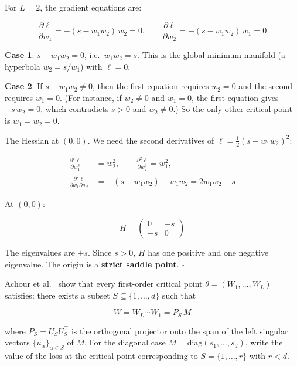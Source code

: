 \documentclass[11pt]{article}
\begin{document}
\begin{solution}[ex:td-1b]
For \(L = 2\), the gradient equations are:

\[\frac{\partial \ell}{\partial w_1} = -(s - w_1 w_2)\,w_2 = 0, \qquad \frac{\partial \ell}{\partial w_2} = -(s - w_1 w_2)\,w_1 = 0\]

\textbf{Case 1}: \(s - w_1 w_2 = 0\), i.e.~\(w_1 w_2 = s\). This is the
global minimum manifold (a hyperbola \(w_2 = s/w_1\)) with \(\ell = 0\).

\textbf{Case 2}: If \(s - w_1 w_2 \neq 0\), then the first equation
requires \(w_2 = 0\) and the second requires \(w_1 = 0\). (For instance,
if \(w_2 \neq 0\) and \(w_1 = 0\), the first equation gives
\(-s\,w_2 = 0\), which contradicts \(s > 0\) and \(w_2 \neq 0\).) So the
only other critical point is \(w_1 = w_2 = 0\).

The Hessian at \((0,0)\). We need the second derivatives of
\(\ell = \frac{1}{2}(s - w_1 w_2)^2\):

\begin{align*}
\frac{\partial^2 \ell}{\partial w_1^2} &= w_2^2, \qquad \frac{\partial^2 \ell}{\partial w_2^2} = w_1^2, \\
\frac{\partial^2 \ell}{\partial w_1 \partial w_2} &= -(s - w_1 w_2) + w_1 w_2 = 2w_1 w_2 - s
\end{align*}

At \((0,0)\):

\[H = \begin{pmatrix} 0 & -s \\ -s & 0 \end{pmatrix}\]

The eigenvalues are \(\pm s\). Since \(s > 0\), \(H\) has one positive
and one negative eigenvalue. The origin is a \textbf{strict saddle
point}. \(\square\)
\end{solution}

\begin{exercise}
\label{ex:td-1c}
Achour et al.~\cite{achour2024} show that every
first-order critical point \(\theta = (W_1, \ldots, W_L)\) satisfies:
there exists a subset \(S \subseteq \{1, \ldots, d\}\) such that

\[W = W_L \cdots W_1 = P_S\, M\]

where \(P_S = U_S U_S^\top\) is the orthogonal projector onto the span
of the left singular vectors \(\{u_\alpha\}_{\alpha \in S}\) of \(M\).
For the diagonal case \(M = \text{diag}(s_1, \ldots, s_d)\), write the
value of the loss at the critical point corresponding to
\(S = \{1, \ldots, r\}\) with \(r < d\).
\end{exercise}
\end{document}
